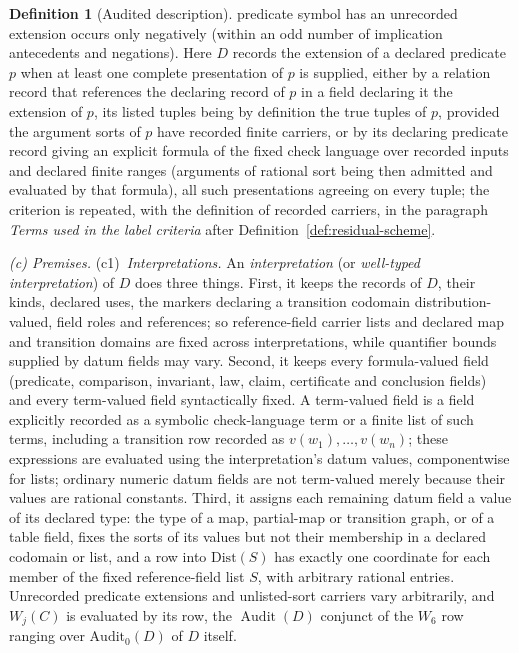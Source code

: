 \documentclass[11pt]{article}
\theoremstyle{definition}
\newtheorem{definition}[theorem]{Definition}
\newcommand{\Audit}[1]{\ensuremath{\operatorname{Audit}\!\left(#1\right)}}
\begin{document}
\begin{definition}[Audited description]
predicate symbol has an unrecorded extension occurs only negatively (within an
odd number of implication antecedents and negations). Here \(D\) records the extension of a declared predicate \(p\) when at least
one complete presentation of \(p\) is supplied, either by a relation record
that references the declaring record of \(p\) in a field declaring it the
extension of \(p\), its listed tuples being by definition the true tuples of
\(p\), provided the argument sorts of \(p\) have recorded finite carriers, or
by its declaring predicate record giving an explicit formula of the fixed check
language over recorded inputs and declared finite ranges (arguments of
rational sort being then admitted and evaluated by that formula), all such presentations agreeing on
every tuple; the criterion is repeated, with the definition of recorded
carriers, in the paragraph \emph{Terms used in the label criteria} after
Definition~\ref{def:residual-scheme}.
\par\emph{(c) Premises.} (c1)~\emph{Interpretations.} An \emph{interpretation} (or \emph{well-typed interpretation}) of \(D\) does three things. First, it keeps the records of \(D\), their kinds, declared uses, the markers declaring a transition codomain distribution-valued, field roles and references; so reference-field carrier lists and declared map and transition domains are fixed across interpretations, while quantifier bounds supplied by datum fields may vary. Second, it keeps every formula-valued field (predicate, comparison, invariant, law, claim, certificate and conclusion fields) and every term-valued field syntactically fixed. A term-valued field is a field explicitly recorded as a symbolic check-language term or a finite list of such terms, including a transition row recorded as \(v(w_1),\dots,v(w_n)\); these expressions are evaluated using the interpretation's datum values, componentwise for lists; ordinary numeric datum fields are not term-valued merely because their values are rational constants. Third, it assigns each remaining datum field a value of its declared type: the type of a map, partial-map or transition graph, or of a table field, fixes the sorts of its values but not their membership in a declared codomain or list, and a row into \(\mathrm{Dist}(S)\) has exactly one coordinate for each member of the fixed reference-field list \(S\), with arbitrary rational entries. Unrecorded predicate extensions and unlisted-sort carriers vary arbitrarily, and \(W_j(C)\) is evaluated by its row, the \(\Audit{D}\) conjunct of the \(W_6\) row ranging over \(\mathrm{Audit}_0(D)\) of \(D\) itself.

\end{definition}
\end{document}
